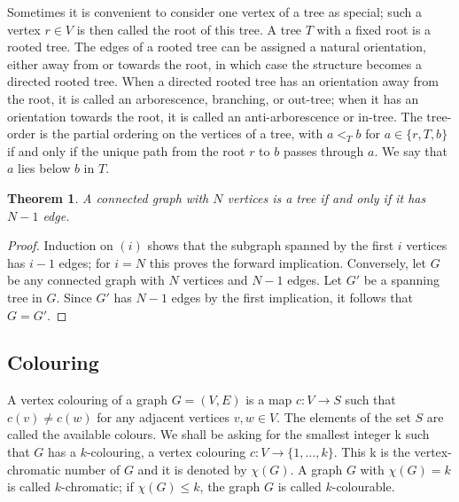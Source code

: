 \documentclass[10pt,a4paper]{book}
\numberwithin{equation}{chapter}
\numberwithin{figure}{chapter}
\numberwithin{table}{chapter}
\newtheorem{theorem}{Theorem}[section]
\begin{document}
Sometimes it is convenient to consider one vertex of a tree as special; such a vertex $r\in V$ is then called the root of this tree. A tree $T$ with a fixed root is a rooted tree. The edges of a rooted tree can be assigned a natural orientation, either away from or towards the root, in which case the structure becomes a directed rooted tree.
When a directed rooted tree has an orientation away from the root, it is called an arborescence, branching, or out-tree; when it has an orientation towards the root, it is called an anti-arborescence or in-tree. The tree-order is the partial ordering on the vertices of a tree, with $a<_{T}b$ for $a \in \lbrace r,T,b\rbrace$ if and only if the unique path from the root $r$ to $b$ passes through $a$. We say that $a$ lies below $b$ in $T$.

\begin{theorem}
A connected graph with $N$ vertices is a tree if and only if it has $N-1$ edge.\end{theorem} 
\begin{proof} Induction on $(i)$ shows that the subgraph spanned by the first
$i$ vertices has $i-1$ edges; for $i=N$ this proves the forward implication. Conversely, let $G$ be any connected graph with $N$ vertices and $N-1$ edges. Let $G'$ be a spanning tree in $G$. Since $G'$ has $N-1$ edges by the first implication, it follows that $G=G'$.
\end{proof}

\subsection{Colouring}
A vertex colouring of a graph $G=(V,E)$ is a map $c: V \rightarrow S$ such that $c(v)\neq c(w)$ for any adjacent vertices $v,w \in V$. The elements of the set $S$ are called the available colours. We shall be asking for the smallest integer k such that
$G$ has a $k$-colouring, a vertex colouring $c: V\rightarrow \lbrace 1,\ldots , k\rbrace$. This k is the vertex-chromatic number of $G$ and it is denoted by $\chi (G)$. A graph $G$ with $\chi (G)=k$ is called $k$-chromatic; if $\chi (G)\leq k$, the graph $G$ is called $k$-colourable.
\end{document}
